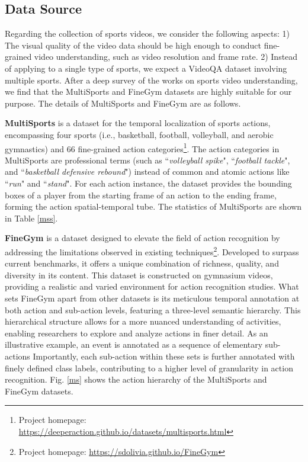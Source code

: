 \subsection{Data Source}

Regarding the collection of sports videos, we consider the following aspects: 1) The visual quality of the video data should be high enough to conduct fine-grained video understanding, such as video resolution and frame rate. 2) Instead of applying to a single type of sports, we expect a VideoQA dataset involving multiple sports.
After a deep survey of the works on sports video understanding, we find that the MultiSports \citep{li2021multisports} and FineGym \citep{shao2020finegym} datasets are highly suitable for our purpose. The details of MultiSports and FineGym are as follows.

\noindent\textbf{MultiSports} \citep{li2021multisports} is a dataset for the temporal localization of sports actions, encompassing four sports (i.e., basketball, football, volleyball, and aerobic gymnastics) and 66 fine-grained action categories\footnote{Project homepage: \url{https://deeperaction.github.io/datasets/multisports.html}}. The action categories in MultiSports are professional terms (such as ``\textit{volleyball spike}", ``\textit{football tackle}", and ``\textit{basketball defensive rebound}") instead of common and atomic actions like ``\textit{run}" and ``\textit{stand}". For each action instance, the dataset provides the bounding boxes of a player from the starting frame of an action to the ending frame, forming the action spatial-temporal tube. The statistics of MultiSports are shown in Table \ref{mss}.

\noindent\textbf{FineGym} \citep{shao2020finegym} is a dataset designed to elevate the field of action recognition by addressing the limitations observed in existing techniques\footnote{Project homepage: \url{https://sdolivia.github.io/FineGym}}. Developed to surpass current benchmarks, it offers a unique combination of richness, quality, and diversity in its content.
This dataset is constructed on gymnasium videos, providing a realistic and varied environment for action recognition studies. What sets FineGym apart from other datasets is its meticulous temporal annotation at both action and sub-action levels, featuring a three-level semantic hierarchy. This hierarchical structure allows for a more nuanced understanding of activities, enabling researchers to explore and analyze actions in finer detail. As an illustrative example, an event is annotated as a sequence of elementary sub-actions Importantly, each sub-action within these sets is further annotated with finely defined class labels, contributing to a higher level of granularity in action recognition. Fig. \ref{ms} shows the action hierarchy of the MultiSports and FineGym datasets.

